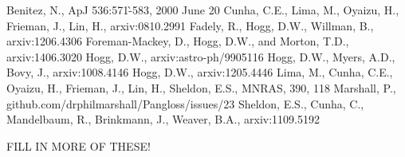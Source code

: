 \documentclass[12pt, onecolumn]{emulateapj}
\begin{document}


\begin{thebibliography}{}
Benitez, N., ApJ 536:571-̀583, 2000 June 20
Cunha, C.E., Lima, M., Oyaizu, H., Frieman, J., Lin, H., arxiv:0810.2991
Fadely, R., Hogg, D.W., Willman, B., arxiv:1206.4306
Foreman-Mackey, D., Hogg, D.W., and Morton, T.D., arxiv:1406.3020
Hogg, D.W., arxiv:astro-ph/9905116
Hogg, D.W., Myers, A.D., Bovy, J., arxiv:1008.4146
Hogg, D.W., arxiv:1205.4446
Lima, M., Cunha, C.E., Oyaizu, H., Frieman, J., Lin, H., Sheldon, E.S., MNRAS, 390, 118
Marshall, P., github.com/drphilmarshall/Pangloss/issues/23
Sheldon, E.S., Cunha, C., Mandelbaum, R., Brinkmann, J., Weaver, B.A., arxiv:1109.5192

FILL IN MORE OF THESE!
\end{thebibliography}
\end{document}
